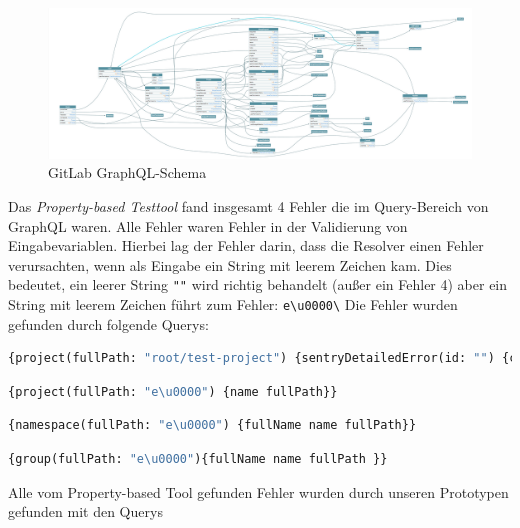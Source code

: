 \begin{figure}[H]
    \begin{center}
        \includegraphics[width=\textwidth,height=\textheight,keepaspectratio]{img/gitlabgraph}
    \end{center}
    \caption{GitLab GraphQL-Schema}
    \label{gitlabschema}
\end{figure}

Das \textit{Property-based Testtool} fand insgesamt 4 Fehler die im Query-Bereich von GraphQL waren.
Alle Fehler waren Fehler in der Validierung von Eingabevariablen.
Hierbei lag der Fehler darin, dass die Resolver einen Fehler verursachten, wenn als Eingabe ein String mit leerem Zeichen kam.
Dies bedeutet, ein leerer String \verb+""+ wird richtig behandelt (außer ein Fehler 4) aber ein String mit leerem Zeichen führt zum Fehler: \verb+e\u0000\+
Die Fehler wurden gefunden durch folgende Querys:

\begin{lstlisting}[language=GraphQL, caption=Fehler 1\cite{issue1}]
{project(fullPath: "root/test-project") {sentryDetailedError(id: "") {count}}}
\end{lstlisting}

\begin{lstlisting}[language=GraphQL, caption=Fehler 2\cite{issue2}]
{project(fullPath: "e\u0000") {name fullPath}}
\end{lstlisting}

\begin{lstlisting}[language=GraphQL, caption=Fehler 3\cite{issue3}]
{namespace(fullPath: "e\u0000") {fullName name fullPath}}
\end{lstlisting}

\begin{lstlisting}[language=GraphQL, caption=Fehler 4\cite{issue4}]
{group(fullPath: "e\u0000"){fullName name fullPath }}
\end{lstlisting}

Alle vom Property-based Tool gefunden Fehler wurden durch unseren Prototypen gefunden mit den Querys


